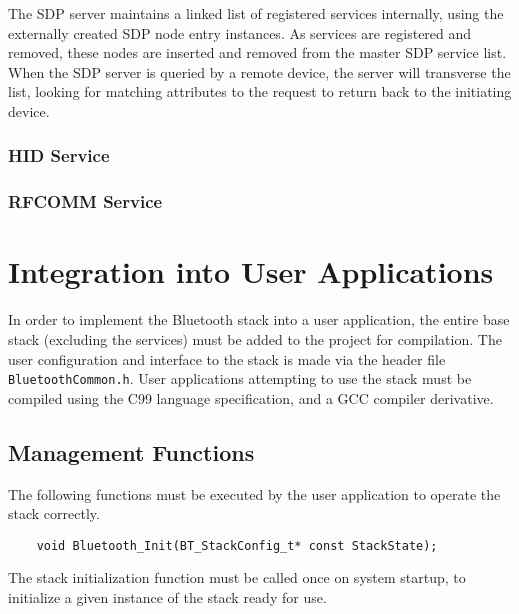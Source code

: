 


The SDP server maintains a linked list of registered services internally, using the externally created SDP node entry instances. As services are registered and removed, these nodes are inserted and removed from the master SDP service list. When the SDP server is queried by a remote device, the server will transverse the list, looking for matching attributes to the request to return back to the initiating device.

\FloatBarrier
\subsubsection{HID Service}


\FloatBarrier
\subsubsection{RFCOMM Service}


\section{Integration into User Applications}

In order to implement the Bluetooth stack into a user application, the entire base stack (excluding the services) must be added to the project for compilation. The user configuration and interface to the stack is made via the header file \texttt{BluetoothCommon.h}. User applications attempting to use the stack must be compiled using the C99 language specification, and a GCC compiler derivative.

\FloatBarrier
\subsection{Management Functions}

The following functions must be executed by the user application to operate the stack correctly.

\vspace{1em}
\begin{lstlisting}
	void Bluetooth_Init(BT_StackConfig_t* const StackState);
\end{lstlisting}

The stack initialization function must be called once on system startup, to initialize a given instance of the stack ready for use.

